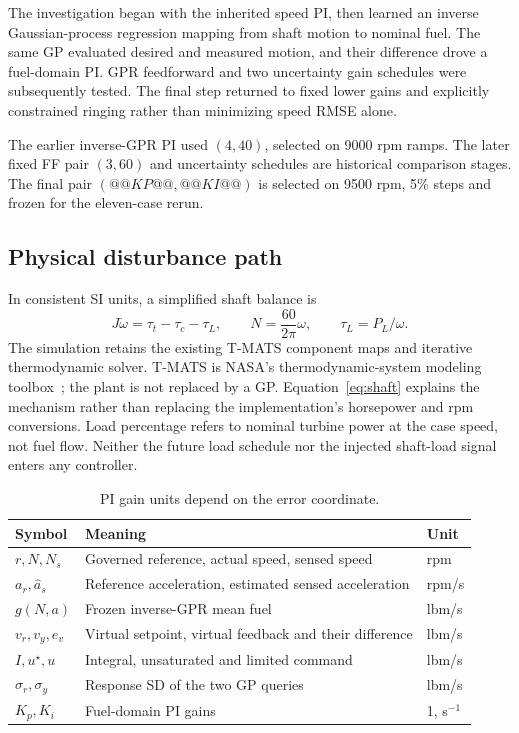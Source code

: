 The investigation began with the inherited speed PI, then learned an inverse Gaussian-process regression mapping from shaft motion to nominal fuel. The same GP evaluated desired and measured motion, and their difference drove a fuel-domain PI. GPR feedforward and two uncertainty gain schedules were subsequently tested. The final step returned to fixed lower gains and explicitly constrained ringing rather than minimizing speed RMSE alone.

The earlier inverse-GPR PI used $(4,40)$, selected on 9000 rpm ramps. The later fixed FF pair $(3,60)$ and uncertainty schedules are historical comparison stages. The final pair $(@@KP@@,@@KI@@)$ is selected on 9500 rpm, 5\% steps and frozen for the eleven-case rerun.

\subsection{Physical disturbance path}
In consistent SI units, a simplified shaft balance is
\begin{equation}
J\dot\omega=\tau_t-\tau_c-\tau_L,\qquad N=\frac{60}{2\pi}\omega,\qquad \tau_L=P_L/\omega.
\label{eq:shaft}
\end{equation}
The simulation retains the existing T-MATS component maps and iterative thermodynamic solver. T-MATS is NASA's thermodynamic-system modeling toolbox~\cite{tmats}; the plant is not replaced by a GP. Equation~\eqref{eq:shaft} explains the mechanism rather than replacing the implementation's horsepower and rpm conversions. Load percentage refers to nominal turbine power at the case speed, not fuel flow. Neither the future load schedule nor the injected shaft-load signal enters any controller.

\begin{table}[H]\centering\small
\begin{tabularx}{\linewidth}{@{}lXl@{}}\toprule Symbol & Meaning & Unit\\\midrule
$r,N,N_s$ & Governed reference, actual speed, sensed speed & rpm\\
$a_r,\hat a_s$ & Reference acceleration, estimated sensed acceleration & rpm/s\\
$g(N,a)$ & Frozen inverse-GPR mean fuel & lbm/s\\
$v_r,v_y,e_v$ & Virtual setpoint, virtual feedback and their difference & lbm/s\\
$I,u^\star,u$ & Integral, unsaturated and limited command & lbm/s\\
$\sigma_r,\sigma_y$ & Response SD of the two GP queries & lbm/s\\
$K_p,K_i$ & Fuel-domain PI gains & 1, s$^{-1}$\\\bottomrule
\end{tabularx}\caption{PI gain units depend on the error coordinate.}\end{table}

